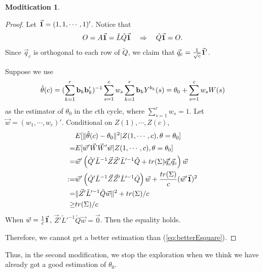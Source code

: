 \documentclass{article}
\theoremstyle{plain}
\theoremstyle{definition}
\newtheorem{modification}{Moditication}
\begin{document}
\begin{modification}
\begin{proof}
Let $\vec{\bold{1}}=(1,1,\cdots,1)'$. Notice that
\begin{align*}
{O}=A\vec{\bold{1}}=\tilde{L}\tilde{Q}\vec{\bold{1}}\quad \Rightarrow\quad \tilde{Q}\vec{\bold{1}}=O.
\end{align*}
Since $\vec{q}_c$ is orthogonal to each row of $\tilde{Q}$, 
we claim that $\vec{q}_c=\frac{1}{\sqrt{c}}\vec{\bold{1}}'$. 

Suppose we use 
\[
\hat{\theta}(c)=(\sum_{k=1}^{r}\bold{b}_k\bold{b}_k')^{-1}\sum_{s=1}^{c}w_s\sum_{k=1}^{r}\bold{b}_kY^{b_k}(s)=\theta_0+\sum_{s=1}^{c}w_s W(s)
\]
as the estimator of $\theta_0$ in the $c$th cycle, where $\sum_{s=1}^{c}w_s=1$. Let $\vec{w}=(w_1,\cdots,w_c)'$. Conditional on $Z(1),\cdots,Z(c)$, 
\begin{align*}
&E[\|\hat{\theta}(c)-\theta_0\|^2|Z(1,\cdots,c),\theta=\theta_0]\\
=&E[\vec{w}'\vec{W}\vec{W}'\vec{w}|Z(1,\cdots,c),\theta=\theta_0]\\
=& \vec{w}'\left(\tilde{Q}'\tilde{L}^{-1}\vec{Z}\vec{Z}'\tilde{L}'^{-1}\tilde{Q} + tr(\Sigma)\vec{q}_c'\vec{q}_c\right)\vec{w}\\
:=&\vec{w}'\left(\tilde{Q}'\tilde{L}^{-1}\vec{Z}\vec{Z}'\tilde{L}'^{-1}\tilde{Q}\right)\vec{w}+\frac{tr(\Sigma)}{c}(\vec{w}'\vec{\bold{1}})^2\\
=&\|\vec{Z}'\tilde{L}'^{-1}\tilde{Q}\vec{w}\|^2+tr(\Sigma)/c\\
\geq & tr(\Sigma)/c
\end{align*}
When $\vec{w}=\frac{1}{c}\vec{\bold{1}}$, $\vec{Z}'\tilde{L}'^{-1}\tilde{Q}\vec{w}=\vec{0}$. Then the equality holds.

Therefore, we cannot get a better estimation than (\ref{eq:betterEsquare}).

\end{proof}

Thus, in the second modification, we stop the exploration when we think we have already got a good estimation of $\theta_{0}$.


\end{modification}
\end{document}
